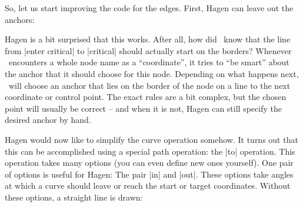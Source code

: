 So, let us start improving the code for the edges. First, Hagen can leave out
the anchors:
%
\begin{codeexample}[preamble={\usetikzlibrary{positioning}}]
\end{codeexample}

Hagen is a bit surprised that this works. After all, how did \tikzname\ know
that the line from |enter critical| to |critical| should actually start on the
borders? Whenever \tikzname\ encounters a whole node name as a ``coordinate'',
it tries to ``be smart'' about the anchor that it should choose for this node.
Depending on what happens next, \tikzname\ will choose an anchor that lies on
the border of the node on a line to the next coordinate or control point. The
exact rules are a bit complex, but the chosen point will usually be correct --
and when it is not, Hagen can still specify the desired anchor by hand.

Hagen would now like to simplify the curve operation somehow. It turns out that
this can be accomplished using a special path operation: the |to| operation.
This operation takes many options (you can even define new ones yourself). One
pair of options is useful for Hagen: The pair |in| and |out|. These options
take angles at which a curve should leave or reach the start or target
coordinates. Without these options, a straight line is drawn:
%
\begin{codeexample}[preamble={\usetikzlibrary{positioning}}]
\end{codeexample}

